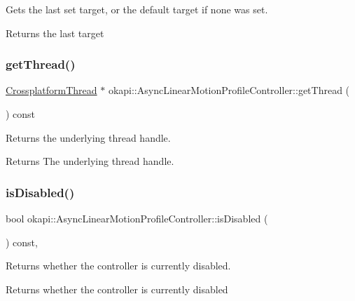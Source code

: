 Gets the last set target, or the default target if none was set.

\begin{DoxyReturn}{Returns}
the last target 
\end{DoxyReturn}
\mbox{\label{classokapi_1_1AsyncLinearMotionProfileController_a944e0c5f2dfa054ccfc554c8440f4aef}} 
\subsubsection{\texorpdfstring{getThread()}{getThread()}}
{\footnotesize\ttfamily \mbox{\hyperlink{classCrossplatformThread}{Crossplatform\+Thread}} $\ast$ okapi\+::\+Async\+Linear\+Motion\+Profile\+Controller\+::get\+Thread (\begin{DoxyParamCaption}{ }\end{DoxyParamCaption}) const}

Returns the underlying thread handle.

\begin{DoxyReturn}{Returns}
The underlying thread handle. 
\end{DoxyReturn}
\mbox{\label{classokapi_1_1AsyncLinearMotionProfileController_a99ae2e378cc88745c82a08b6ddf52ee4}} 
\subsubsection{\texorpdfstring{isDisabled()}{isDisabled()}}
{\footnotesize\ttfamily bool okapi\+::\+Async\+Linear\+Motion\+Profile\+Controller\+::is\+Disabled (\begin{DoxyParamCaption}{ }\end{DoxyParamCaption}) const\hspace{0.3cm}{\ttfamily [override]}, {\ttfamily [virtual]}}

Returns whether the controller is currently disabled.

\begin{DoxyReturn}{Returns}
whether the controller is currently disabled 
\end{DoxyReturn}


